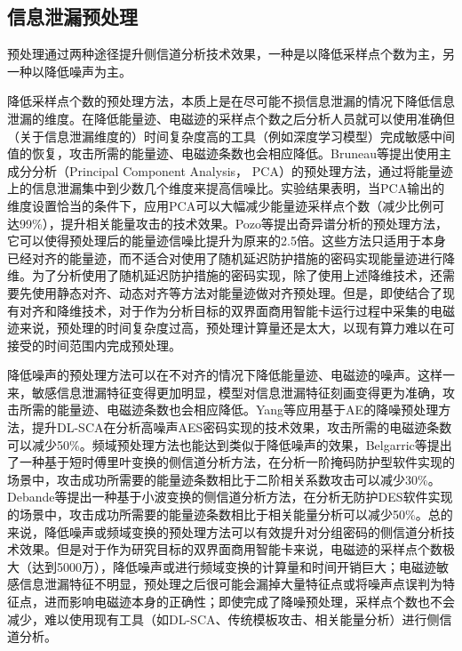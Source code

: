 {	\subsection{信息泄漏预处理}
	预处理通过两种途径提升侧信道分析技术效果，一种是以降低采样点个数为主，另一种以降低噪声为主。
	
	降低采样点个数的预处理方法，本质上是在尽可能不损信息泄漏的情况下降低信息泄漏的维度。在降低能量迹、电磁迹的采样点个数之后分析人员就可以使用准确但（关于信息泄漏维度的）时间复杂度高的工具（例如深度学习模型）完成敏感中间值的恢复，攻击所需的能量迹、电磁迹条数也会相应降低。Bruneau等\citep{bruneau:hal-01218072}提出使用主成分分析（Principal Component Analysis， PCA）的预处理方法，通过将能量迹上的信息泄漏集中到少数几个维度来提高信噪比。实验结果表明，当PCA输出的维度设置恰当的条件下，应用PCA可以大幅减少能量迹采样点个数（减少比例可达99\%），提升相关能量攻击的技术效果。Pozo等\citep{Pozo15}提出奇异谱分析的预处理方法，它可以使得预处理后的能量迹信噪比提升为原来的2.5倍。这些方法只适用于本身已经对齐的能量迹，而不适合对使用了随机延迟防护措施的密码实现能量迹进行降维。为了分析使用了随机延迟防护措施的密码实现，除了使用上述降维技术，还需要先使用静态对齐\citep{Homma08}、动态对齐\citep{Woudenberg11}等方法对能量迹做对齐预处理。但是，即使结合了现有对齐和降维技术，对于作为分析目标的双界面商用智能卡运行过程中采集的电磁迹来说，预处理的时间复杂度过高，预处理计算量还是太大，以现有算力难以在可接受的时间范围内完成预处理。
	
	降低噪声的预处理方法可以在不对齐的情况下降低能量迹、电磁迹的噪声。这样一来，敏感信息泄漏特征变得更加明显，模型对信息泄漏特征刻画变得更为准确，攻击所需的能量迹、电磁迹条数也会相应降低。Yang等\citep{Yang19}应用基于AE的降噪预处理方法，提升DL-SCA在分析高噪声AES密码实现的技术效果，攻击所需的电磁迹条数可以减少50\%。频域预处理方法也能达到类似于降低噪声的效果，Belgarric等\citep{Belgarric16}提出了一种基于短时傅里叶变换的侧信道分析方法，在分析一阶掩码防护型软件实现的场景中，攻击成功所需要的能量迹条数相比于二阶相关系数攻击可以减少30\%。Debande等\citep{Debande12}提出一种基于小波变换的侧信道分析方法，在分析无防护DES软件实现的场景中，攻击成功所需要的能量迹条数相比于相关能量分析可以减少50\%。总的来说，降低噪声或频域变换的预处理方法可以有效提升对分组密码的侧信道分析技术效果。但是对于作为研究目标的双界面商用智能卡来说，电磁迹的采样点个数极大（达到5000万），降低噪声或进行频域变换的计算量和时间开销巨大；电磁迹敏感信息泄漏特征不明显，预处理之后很可能会漏掉大量特征点或将噪声点误判为特征点，进而影响电磁迹本身的正确性；即使完成了降噪预处理，采样点个数也不会减少，难以使用现有工具（如DL-SCA、传统模板攻击、相关能量分析）进行侧信道分析。
	
}
